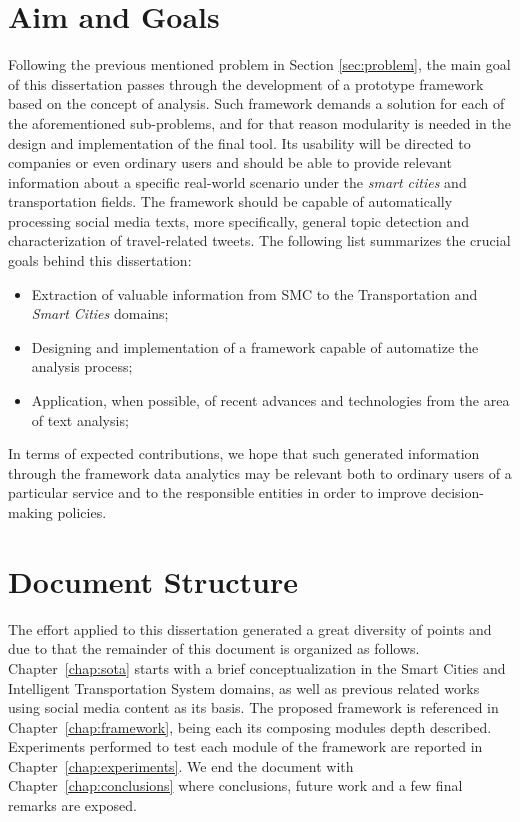 \section{Aim and Goals}\label{sec:aim_goals}
Following the previous mentioned problem in Section \ref{sec:problem}, the main goal of this dissertation passes through the development of a prototype framework based on the concept of analysis. Such framework demands a solution for each of the aforementioned sub-problems, and for that reason modularity is needed in the design and implementation of the final tool. Its usability will be directed to companies or even ordinary users and should be able to provide relevant information about a specific real-world scenario under the \textit{smart cities} and transportation fields. The framework should be capable of automatically processing social media texts, more specifically, general topic detection and characterization of travel-related tweets. The following list summarizes the crucial goals behind this dissertation:

\begin{itemize}
	\item Extraction of valuable information from \gls{SMC} to the Transportation and \textit{Smart Cities} domains;
	\item Designing and implementation of a framework capable of automatize the analysis process;
	\item Application, when possible, of recent advances and technologies from the area of text analysis;
\end{itemize}

\medskip

In terms of expected contributions, we hope that such generated information through the framework data analytics may be relevant both to ordinary users of a particular service and to the responsible entities in order to improve decision-making policies.

\section{Document Structure}\label{sec:doc_structure}
The effort applied to this dissertation generated a great diversity of points and due to that the remainder of this document is organized as follows.
Chapter~\ref{chap:sota} starts with a brief conceptualization in the Smart Cities and Intelligent Transportation System domains, as well as previous related works using social media content as its basis.
The proposed framework is referenced in Chapter~\ref{chap:framework}, being each its composing modules depth described.
Experiments performed to test each module of the framework are reported in Chapter~\ref{chap:experiments}.
We end the document with Chapter~\ref{chap:conclusions} where conclusions, future work and a few final remarks are exposed.